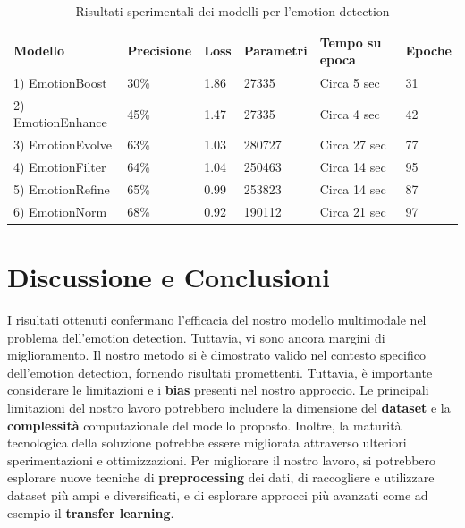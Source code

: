 \documentclass{article}
\begin{document}
\begin{table}[h]
\begin{adjustwidth}{-0.5cm}{}
\centering
\begin{tabular}{@{}llllll@{}}
\toprule
\textbf{Modello} & \textbf{Precisione} & \textbf{Loss} & \textbf{Parametri} & \textbf{Tempo su epoca} & \textbf{Epoche}  \\ \midrule
1) EmotionBoost & 30\% & 1.86 & 27335 & Circa 5 sec  & 31 \\
2) EmotionEnhance & 45\% & 1.47 & 27335 & Circa 4 sec & 42 \\
3) EmotionEvolve & 63\% & 1.03 & 280727 & Circa 27 sec & 77 \\
4) EmotionFilter & 64\% & 1.04 & 250463 & Circa 14 sec & 95 \\
5) EmotionRefine & 65\% & 0.99 & 253823 & Circa 14 sec & 87 \\
6) EmotionNorm & 68\% & 0.92 & 190112 & Circa 21 sec & 97\\ \bottomrule
\end{tabular}
\caption{Risultati sperimentali dei modelli per l'emotion detection}
\label{tab:results}
\end{adjustwidth}
\end{table}

\newpage 

\section{Discussione e Conclusioni}
I risultati ottenuti confermano l'efficacia del nostro modello multimodale nel problema dell'emotion detection. Tuttavia, vi sono ancora margini di miglioramento.
Il nostro metodo si è dimostrato valido nel contesto specifico dell'emotion detection, fornendo risultati promettenti. Tuttavia, è importante considerare le limitazioni e i \textbf{bias} presenti nel nostro approccio.
Le principali limitazioni del nostro lavoro potrebbero includere la dimensione del \textbf{dataset} e la \textbf{complessità} computazionale del modello proposto. Inoltre, la maturità tecnologica della soluzione potrebbe essere migliorata attraverso ulteriori sperimentazioni e ottimizzazioni.
Per migliorare il nostro lavoro, si potrebbero esplorare nuove tecniche di \textbf{preprocessing} dei dati, di raccogliere e utilizzare dataset più ampi e diversificati, e di esplorare approcci più avanzati come ad esempio il \textbf{transfer learning}.
\end{document}

